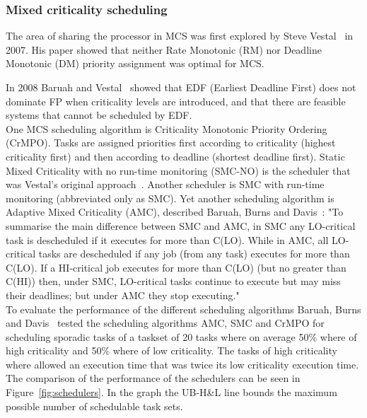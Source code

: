 \subsubsection{Mixed criticality scheduling}
The area of sharing the processor in MCS was first explored by Steve Vestal~\cite{vestal2007} in 2007. His paper showed that neither Rate Monotonic (RM) nor Deadline Monotonic (DM) priority assignment was optimal for MCS.%

In 2008 Baruah and Vestal~\cite{baruah2008} showed that EDF (Earliest Deadline First) does not dominate FP when criticality levels are introduced, and that there are feasible systems that cannot be scheduled by EDF.\\

One MCS scheduling algorithm is Criticality Monotonic Priority Ordering (CrMPO). Tasks are assigned priorities first according to criticality (highest criticality first) and then according to deadline (shortest deadline first). Static Mixed Criticality with no run-time monitoring (SMC-NO) is the scheduler that was Vestal's original approach~\cite{vestal2007}. Another scheduler is SMC with run-time monitoring (abbreviated only as SMC). Yet another scheduling algorithm is Adaptive Mixed Criticality (AMC), described Baruah, Burns and Davis~\cite{baruah2011}: "To summarise the main difference between SMC and AMC, in SMC any LO-critical task is descheduled if it executes for more than C(LO). While in AMC, all LO-critical tasks are descheduled if any job (from any task) executes for more than C(LO). If a HI-critical job executes for more than C(LO) (but no greater than C(HI)) then, under SMC, LO-critical tasks continue to execute but may miss their deadlines; but under AMC they stop executing."\\

To evaluate the performance of the different scheduling algorithms Baruah, Burns and Davis~\cite{baruah2011} tested the scheduling algorithms AMC, SMC and CrMPO for scheduling sporadic tasks of a taskset of 20 tasks where on average 50\% where of high criticality and 50\% where of low criticality. The tasks of high criticality where allowed an execution time that was twice its low criticality execution time. The comparison of the performance of the schedulers can be seen in Figure~\ref{fig:schedulers}. In the graph the UB-H\&L line bounds the maximum possible number of schedulable task sets.

